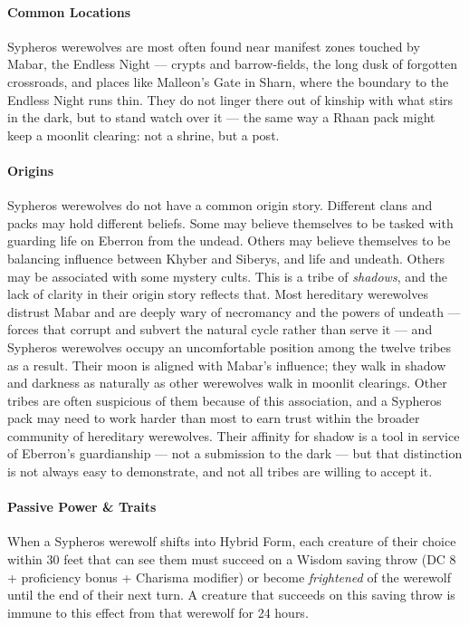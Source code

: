 \documentclass[twocolumn]{dndbook}
\begin{document}
\paragraph*{Common Locations} Sypheros werewolves are most often found near manifest zones touched by Mabar, the Endless Night --- crypts and barrow-fields, the long dusk of forgotten crossroads, and places like Malleon's Gate in Sharn, where the boundary to the Endless Night runs thin.
They do not linger there out of kinship with what stirs in the dark, but to stand watch over it --- the same way a Rhaan pack might keep a moonlit clearing: not a shrine, but a post.

\paragraph*{Origins} Sypheros werewolves do not have a common origin story. Different clans and packs may hold different beliefs. Some may believe themselves to be tasked with guarding life on Eberron from the undead. Others may believe themselves to be balancing influence between Khyber and Siberys, and life and undeath. Others may be associated with some mystery cults. This is a tribe of \emph{shadows}, and the lack of clarity in their origin story reflects that.
Most hereditary werewolves distrust Mabar and are deeply wary of necromancy and the powers of undeath --- forces that corrupt and subvert the natural cycle rather than serve it --- and Sypheros werewolves occupy an uncomfortable position among the twelve tribes as a result.
Their moon is aligned with Mabar's influence; they walk in shadow and darkness as naturally as other werewolves walk in moonlit clearings.
Other tribes are often suspicious of them because of this association, and a Sypheros pack may need to work harder than most to earn trust within the broader community of hereditary werewolves.
Their affinity for shadow is a tool in service of Eberron's guardianship --- not a submission to the dark --- but that distinction is not always easy to demonstrate, and not all tribes are willing to accept it.

\paragraph*{Passive Power \& Traits} When a Sypheros werewolf shifts into Hybrid Form, each creature of their choice within 30 feet that can see them must succeed on a Wisdom saving throw (DC 8 + proficiency bonus + Charisma modifier) or become \emph{frightened} of the werewolf until the end of their next turn.
A creature that succeeds on this saving throw is immune to this effect from that werewolf for 24 hours.
\end{document}
